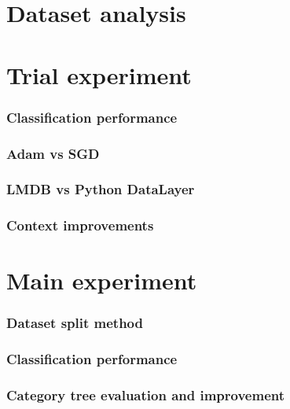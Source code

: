 \section{Dataset analysis}

\section{Trial experiment}
    \subsubsection{Classification performance}
    \subsubsection{Adam vs SGD}
    \subsubsection{LMDB vs Python DataLayer}
    \subsubsection{Context improvements}

\section{Main experiment}
    \subsubsection{Dataset split method}
    \label{sec:split-comparison}
    \subsubsection{Classification performance}
    \subsubsection{Category tree evaluation and improvement}
    \label{sec:tree-eval}
